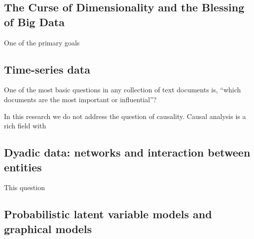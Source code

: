 
\subsection*{The Curse of Dimensionality and the Blessing of Big Data}

One of the primary goals




\subsection*{Time-series data}
One of the most basic questions in any collection of text documents
is, ``which documents are the most important or influential''?

In this research we do not address the question of causality.  Causal
analysis is a rich field with

\subsection*{Dyadic data: networks and interaction between entities}
This question

\subsection*{Probabilistic latent variable models and graphical models}

